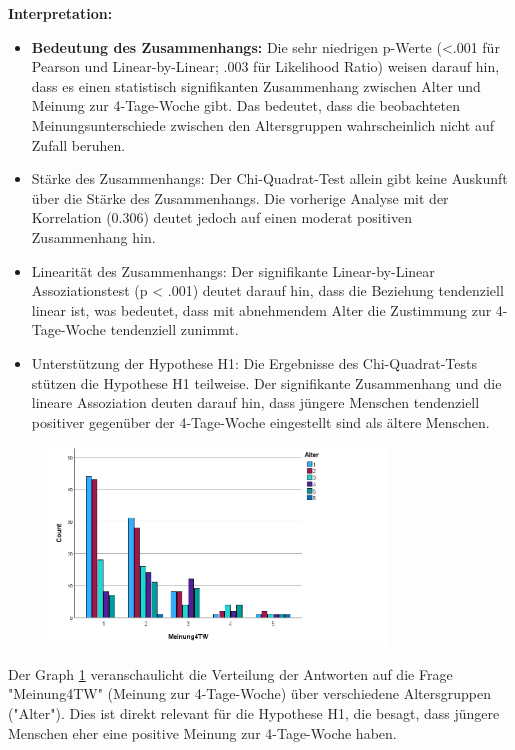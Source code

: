 \textbf{Interpretation:}
\begin{itemize}
    \item \textbf{Bedeutung des Zusammenhangs: }Die sehr niedrigen p-Werte (<.001 für Pearson und 
    Linear-by-Linear; .003 für Likelihood Ratio) weisen darauf hin, dass es einen statistisch 
    signifikanten Zusammenhang zwischen Alter und Meinung zur 4-Tage-Woche gibt. Das bedeutet, dass 
    die beobachteten Meinungsunterschiede zwischen den Altersgruppen wahrscheinlich nicht auf Zufall 
    beruhen.
    \item Stärke des Zusammenhangs: Der Chi-Quadrat-Test allein gibt keine Auskunft über die Stärke 
    des Zusammenhangs. Die vorherige Analyse mit der Korrelation (0.306) deutet jedoch auf einen 
    moderat positiven Zusammenhang hin.
    \item Linearität des Zusammenhangs: Der signifikante Linear-by-Linear Assoziationstest (p < .001) 
    deutet darauf hin, dass die Beziehung tendenziell linear ist, was bedeutet, dass mit abnehmendem 
    Alter die Zustimmung zur 4-Tage-Woche tendenziell zunimmt.
    \item Unterstützung der Hypothese H1: Die Ergebnisse des Chi-Quadrat-Tests stützen die Hypothese 
    H1 teilweise. Der signifikante Zusammenhang und die lineare Assoziation deuten darauf hin, dass 
    jüngere Menschen tendenziell positiver gegenüber der 4-Tage-Woche eingestellt sind als ältere 
    Menschen.
\end{itemize}

\begin{figure}[h]
    \centering
    \includegraphics[width=0.8\textwidth]{04_Artefakte/01_Abbildungen/hypothese_1/h1_graph.png}
    \caption{}
    \label{fig:h1_graph}
\end{figure}

Der Graph \ref*{fig:h1_graph} veranschaulicht die Verteilung der Antworten auf die Frage "Meinung4TW" 
(Meinung zur 4-Tage-Woche) über verschiedene Altersgruppen ("Alter"). Dies ist direkt relevant für 
die Hypothese H1, die besagt, dass jüngere Menschen eher eine positive Meinung zur 4-Tage-Woche haben.


